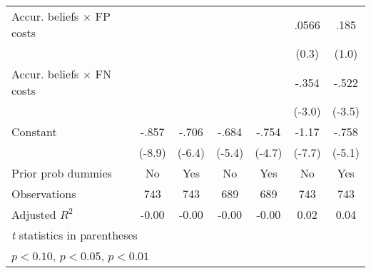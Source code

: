 \begin{table}[htbp]
\begin{tabular}{l*{6}{c}}
Accur. beliefs $\times$ FP costs&                  &                  &                  &                  &    .0566         &     .185         \\
                &                  &                  &                  &                  &    (0.3)         &    (1.0)         \\
Accur. beliefs $\times$ FN costs&                  &                  &                  &                  &    -.354\sym{***}&    -.522\sym{***}\\
                &                  &                  &                  &                  &   (-3.0)         &   (-3.5)         \\
Constant        &    -.857\sym{***}&    -.706\sym{***}&    -.684\sym{***}&    -.754\sym{***}&    -1.17\sym{***}&    -.758\sym{***}\\
                &   (-8.9)         &   (-6.4)         &   (-5.4)         &   (-4.7)         &   (-7.7)         &   (-5.1)         \\
Prior prob dummies &       No         &      Yes         &       No         &      Yes         &       No         &      Yes         \\
\hline
Observations    &      743         &      743         &      689         &      689         &      743         &      743         \\
Adjusted \(R^{2}\)&    -0.00         &    -0.00         &    -0.00         &    -0.00         &     0.02         &     0.04         \\
\hline\hline
\multicolumn{7}{l}{\footnotesize \textit{t} statistics in parentheses}\\
\multicolumn{7}{l}{\footnotesize \sym{*} \(p<0.10\), \sym{**} \(p<0.05\), \sym{***} \(p<0.01\)}\\
\end{tabular}
\end{table}
